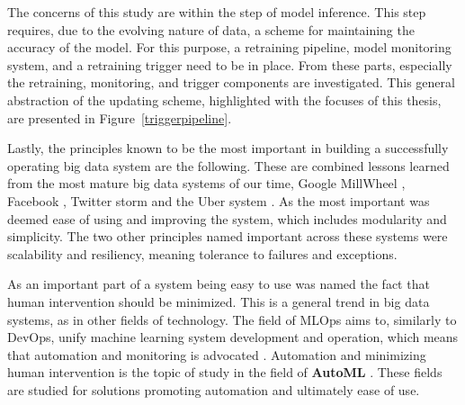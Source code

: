 The concerns of this study are within the step of model inference. This step requires, due to the evolving nature of data, a scheme for maintaining the accuracy of the model. For this purpose, a retraining pipeline, model monitoring system, and a retraining trigger need to be in place. From these parts, especially the retraining, monitoring, and trigger components are investigated. This general abstraction of the updating scheme, highlighted with the focuses of this thesis, are presented in Figure~\ref{triggerpipeline}.

Lastly, the principles known to be the most important in building a successfully operating big data system are the following. These are combined lessons learned from the most mature big data systems of our time, Google MillWheel \cite{millwheel}, Facebook \cite{facebook}, Twitter storm \cite{storm@twitter} and the Uber system \cite{uber}. As the most important was deemed ease of using and improving the system, which includes modularity and simplicity. The two other principles named important across these systems were scalability and resiliency, meaning tolerance to failures and exceptions. 

As an important part of a system being easy to use was named the fact that human intervention should be minimized. This is a general trend in big data systems, as in other fields of technology. The field of MLOps aims to, similarly to DevOps, unify machine learning system development and operation, which means that automation and monitoring is advocated \cite{googlemlops}. Automation and minimizing human intervention is the topic of study in the field of \textbf{AutoML} \cite{celikAdaptationStrategiesAutomated2021}. These fields are studied for solutions promoting automation and ultimately ease of use.

